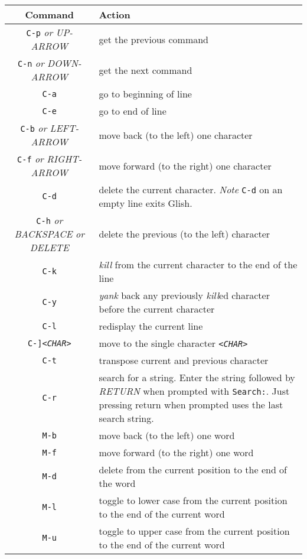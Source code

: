\begin{table}[tbh]
\begin{center}
\begin{tabular}{|c|p{3.0in}|}
\hline
Command & Action   \\
\hline
\hline
{\tt C-p} {\em or} {\em UP-ARROW} 	& get the previous command \\ \hline
{\tt C-n} {\em or} {\em DOWN-ARROW}	& get the next command \\ \hline
{\tt C-a}	& go to beginning of line \\ \hline
{\tt C-e}	& go to end of line \\ \hline
{\tt C-b} {\em or} {\em LEFT-ARROW}	& move back (to the left) one character \\ \hline
{\tt C-f} {\em or} {\em RIGHT-ARROW}	& move forward (to the right) one character \\ \hline
{\tt C-d}	& delete the current character. {\em Note} {\tt C-d} on an
			empty line exits Glish.\\ \hline
{\tt C-h} {\em or} {\em BACKSPACE} {\em or} {\em DELETE}	& delete the 
			previous (to the left) character \\ \hline
{\tt C-k}	& {\em kill} from the current character to
			the end of the line \\ \hline
{\tt C-y}	& {\em yank} back any previously {\em kill}ed character
			before the current character \\ \hline
{\tt C-l}	& redisplay the current line \\ \hline
{\tt C-]{\em \verb-<CHAR>-}}	& move to the single
			character {\tt{\em \verb-<CHAR>-}} \\ \hline
{\tt C-t}	& transpose current and previous character \\ \hline
{\tt C-r}	& search for a string. Enter the string followed by 
			{\em RETURN} when prompted with {\tt Search:}.
			Just pressing return when prompted uses the last
			search string.\\ \hline
{\tt M-b}	& move back (to the left) one word \\ \hline
{\tt M-f}	& move forward (to the right) one word \\ \hline
{\tt M-d}	& delete from the current position to the end 
			of the word \\ \hline
{\tt M-l}	& toggle to lower case from the current position
			to the end of the current word \\ \hline
{\tt M-u}	& toggle to upper case from the current position
			to the end of the current word \\ \hline

\end{tabular}
\end{center}
\end{table}
